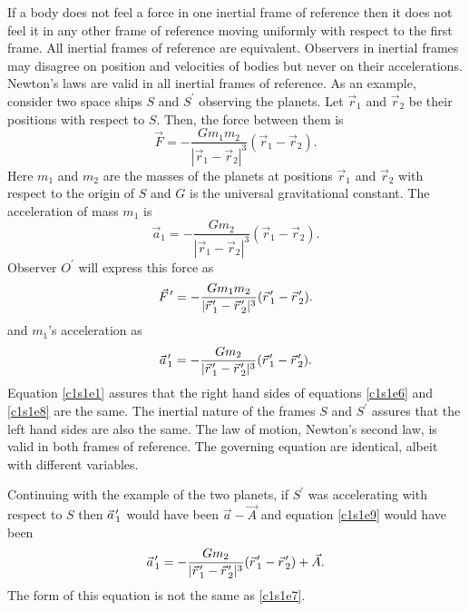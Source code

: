 If a body does not feel a force in one inertial frame of reference then it
does not feel it in any other frame of reference moving uniformly with respect
to the first frame. All inertial frames of reference are equivalent. Observers
in inertial frames may disagree on position and velocities of bodies but never
on their accelerations. Newton's laws are valid in all inertial frames of 
reference. As an example, consider two space ships $S$ and $S^\prime$ observing
the planets. Let $\vec{r}_1$ and $\vec{r}_2$ be their positions with respect
to $S$. Then, the force between them is
\begin{equation}\label{c1s1e6}
\vec{F} = -\frac{Gm_1m_2}{|\vec{r}_1 - \vec{r}_2|^3}(\vec{r}_1 - \vec{r}_2).
\end{equation}
Here $m_1$ and $m_2$ are the masses of the planets at positions $\vec{r}_1$
and $\vec{r}_2$ with respect to the origin of $S$ and $G$ is the universal
gravitational constant. The acceleration of mass 
$m_1$ is
\begin{equation}\label{c1s1e7}
\vec{a}_1 = -\frac{Gm_2} {|\vec{r}_1 - \vec{r}_2|^3}(\vec{r}_1 - \vec{r}_2).
\end{equation}
Observer $O^\prime$ will express this force as
\begin{equation}\label{c1s1e8}
\pvec{F}^\prime = 
-\frac{Gm_1m_2}{|\pvec{r}_1^\prime - \pvec{r}_2^\prime|^3}
(\pvec{r}_1^\prime - \pvec{r}_2^\prime).
\end{equation}
and $m_1$'s acceleration as 
\begin{equation}\label{c1s1e9}
\pvec{a}_1^\prime = -\frac{Gm_2} {|\pvec{r}_1^\prime - \pvec{r}_2^\prime|^3}
(\pvec{r}_1^\prime - \pvec{r}_2^\prime).
\end{equation}
Equation \eqref{c1s1e1} assures that the right hand sides of equations 
\eqref{c1s1e6} and \eqref{c1s1e8} are the same. The inertial nature of the
frames $S$ and $S^\prime$ assures that the left hand sides are also the same.
The law of motion, Newton's second law, is valid in both frames of reference.
The governing equation are identical, albeit with different variables.

Continuing with the example of the two planets, if $S^\prime$ was accelerating
with respect to $S$ then $\pvec{a}_1^\prime$ would have been $\vec{a} - \vec{A}$
and equation \eqref{c1s1e9} would have been
\begin{equation}\label{c1s1e10}
\pvec{a}_1^\prime = -\frac{Gm_2} {|\pvec{r}_1^\prime - \pvec{r}_2^\prime|^3}
(\pvec{r}_1^\prime - \pvec{r}_2^\prime) + \vec{A}.
\end{equation}
The form of this equation is not the same as \eqref{c1s1e7}. 

